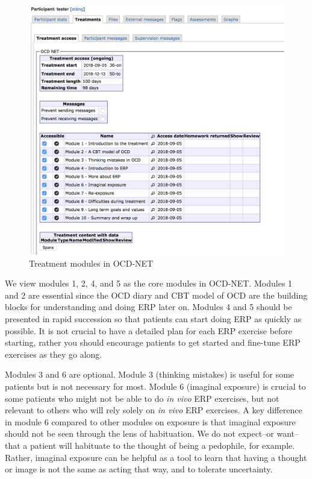 \documentclass[]{book}
\theoremstyle{definition}
\theoremstyle{definition}
\theoremstyle{definition}
\theoremstyle{remark}
\begin{document}
\begin{figure}
\centering
\includegraphics[width=5.20833in,height=\textheight]{images/treatment-overview.png}
\caption{Treatment modules in OCD-NET}
\end{figure}

We view modules 1, 2, 4, and 5 as the core modules in OCD-NET. Modules 1
and 2 are essential since the OCD diary and CBT model of OCD are the
building blocks for understanding and doing ERP later on. Modules 4 and
5 should be presented in rapid succession so that patients can start
doing ERP as quickly as possible. It is not crucial to have a detailed
plan for each ERP exercise before starting, rather you should encourage
patients to get started and fine-tune ERP exercises as they go along.

Modules 3 and 6 are optional. Module 3 (thinking mistakes) is useful for
some patients but is not necessary for most. Module 6 (imaginal
exposure) is crucial to some patients who might not be able to do
\emph{in vivo} ERP exercises, but not relevant to others who will rely
solely on \emph{in vivo} ERP exercises. A key difference in module 6
compared to other modules on exposure is that imaginal exposure should
not be seen through the lens of habituation. We do not expect--or
want--that a patient will habituate to the thought of being a pedophile,
for example. Rather, imaginal exposure can be helpful as a tool to learn
that having a thought or image is not the same as acting that way, and
to tolerate uncertainty.
\end{document}
